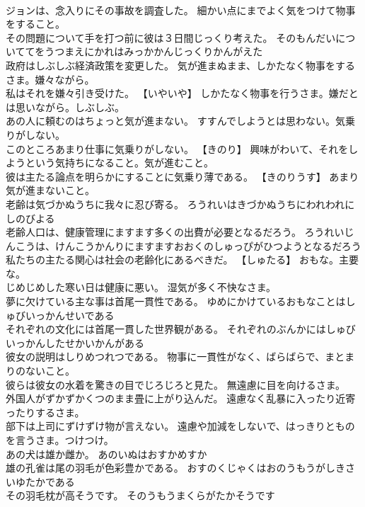 \documentclass[8pt]{extreport}
\begin{document}
\begin{CJK}{UTF8}{min}
\\	ジョンは、念入りにその事故を調査した。	細かい点にまでよく気をつけて物事をすること。
\\	その問題について手を打つ前に彼は３日間じっくり考えた。	そのもんだいについててをうつまえにかれはみっかかんじっくりかんがえた 
\\	政府はしぶしぶ経済政策を変更した。	気が進まぬまま、しかたなく物事をするさま。嫌々ながら。
\\	私はそれを嫌々引き受けた。	【いやいや】 しかたなく物事を行うさま。嫌だとは思いながら。しぶしぶ。
\\	あの人に頼むのはちょっと気が進まない。	すすんでしようとは思わない。気乗りがしない。
\\	このところあまり仕事に気乗りがしない。	【きのり】 興味がわいて、それをしようという気持ちになること。気が進むこと。
\\	彼は主たる論点を明らかにすることに気乗り薄である。	【きのりうす】 あまり気が進まないこと。
\\	老齢は気づかぬうちに我々に忍び寄る。	ろうれいはきづかぬうちにわれわれにしのびよる 
\\	老齢人口は、健康管理にますます多くの出費が必要となるだろう。	ろうれいじんこうは、けんこうかんりにますますおおくのしゅっぴがひつようとなるだろう 
\\	私たちの主たる関心は社会の老齢化にあるべきだ。	【しゅたる】 おもな。主要な。
\\	じめじめした寒い日は健康に悪い。	湿気が多く不快なさま。
\\	夢に欠けている主な事は首尾一貫性である。	ゆめにかけているおもなことはしゅびいっかんせいである 
\\	それぞれの文化には首尾一貫した世界観がある。	それぞれのぶんかにはしゅびいっかんしたせかいかんがある 
\\	彼女の説明はしりめつれつである。	物事に一貫性がなく、ばらばらで、まとまりのないこと。
\\	彼らは彼女の水着を驚きの目でじろじろと見た。	無遠慮に目を向けるさま。
\\	外国人がずかずかくつのまま畳に上がり込んだ。	遠慮なく乱暴に入ったり近寄ったりするさま。
\\	部下は上司にずけずけ物が言えない。	遠慮や加減をしないで、はっきりとものを言うさま。つけつけ。
\\	あの犬は雄か雌か。	あのいぬはおすかめすか 
\\	雄の孔雀は尾の羽毛が色彩豊かである。	おすのくじゃくはおのうもうがしきさいゆたかである 
\\	その羽毛枕が高そうです。	そのうもうまくらがたかそうです 

\end{CJK}
\end{document}
